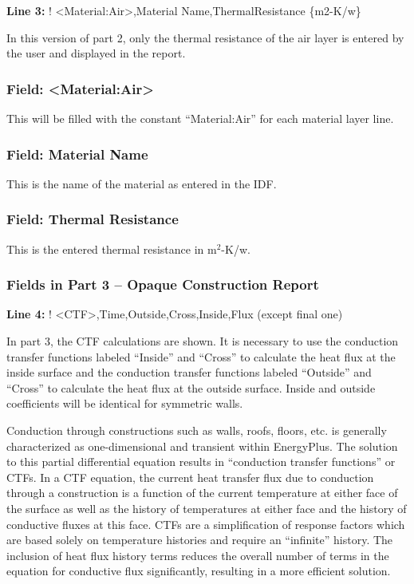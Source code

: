 \textbf{Line 3:} ! \textless{}Material:Air\textgreater{},Material Name,ThermalResistance \{m2-K/w\}

In this version of part 2, only the thermal resistance of the air layer is entered by the user and displayed in the report.

\subsubsection{Field: \textless{}Material:Air\textgreater{}}\label{field-materialair}

This will be filled with the constant ``Material:Air'' for each material layer line.

\subsubsection{Field: Material Name}\label{field-material-name-1}

This is the name of the material as entered in the IDF.

\subsubsection{Field: Thermal Resistance}\label{field-thermal-resistance-1}

This is the entered thermal resistance in m\(^{2}\)-K/w.

\subsubsection{Fields in Part 3 -- Opaque Construction Report}\label{fields-in-part-3-opaque-construction-report}

\textbf{Line 4:} ! \textless{}CTF\textgreater{},Time,Outside,Cross,Inside,Flux (except final one)

In part 3, the CTF calculations are shown. It is necessary to use the conduction transfer functions labeled ``Inside'' and ``Cross'' to calculate the heat flux at the inside surface and the conduction transfer functions labeled ``Outside'' and ``Cross'' to calculate the heat flux at the outside surface. Inside and outside coefficients will be identical for symmetric walls.

Conduction through constructions such as walls, roofs, floors, etc. is generally characterized as one-dimensional and transient within EnergyPlus. The solution to this partial differential equation results in ``conduction transfer functions'' or CTFs. In a CTF equation, the current heat transfer flux due to conduction through a construction is a function of the current temperature at either face of the surface as well as the history of temperatures at either face and the history of conductive fluxes at this face. CTFs are a simplification of response factors which are based solely on temperature histories and require an ``infinite'' history. The inclusion of heat flux history terms reduces the overall number of terms in the equation for conductive flux significantly, resulting in a more efficient solution.

